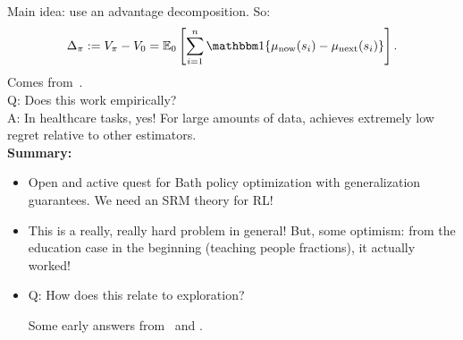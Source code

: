Main idea: use an advantage decomposition. So:
\[
\Delta_\pi := V_\pi - V_0 = \bE_0 \left[\nsum \indic\{\mu_{\tx{now}}(s_i) - \mu_{\tx{next}}(s_i)\}\right].
\]
Comes from~\citet{kakade2003sample,murphy2005generalization}. \\

Q: Does this work empirically? \\

A: In healthcare tasks, yes! For large amounts of data, achieves extremely low regret relative to other estimators. \\

{\bf Summary:}
\begin{itemize}
    \item Open and active quest for Bath policy optimization with generalization guarantees. We need an SRM theory for RL!
    
    \item This is a really, really hard problem in general! But, some optimism: from the education case in the beginning (teaching people fractions), it actually worked!
    
    \item Q: How does this relate to exploration?
    
    Some early answers from~\citet{tu2018gap} and \citet{sun2018model}.
    
    
\end{itemize}



\spacerule



